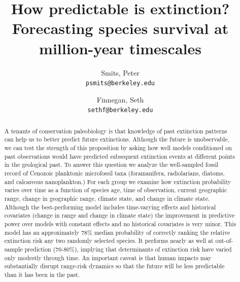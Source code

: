 \documentclass[12pt,letterpaper]{article}
\title{How predictable is extinction? Forecasting species survival at million-year timescales}
\author{
  Smits, Peter\\
  \texttt{psmits@berkeley.edu} 
  \and
  Finnegan, Seth\\
  \texttt{sethf@berkeley.edu}
}
\date{}
\begin{document}
\begin{refsection}

\maketitle

\linenumbers{}
\modulolinenumbers[3]

\begin{abstract}
  A tenants of conservation paleobiology is that knowledge of past extinction patterns can help us to better predict future extinctions. Although the future is unobservable, we can test the strength of this proposition by asking how well models conditioned on past observations would have predicted subsequent extinction events at different points in the geological past. To answer this question we analyze the well-sampled fossil record of Cenozoic planktonic microfossil taxa (foramanifera, radiolarians, diatoms, and calcareous nanoplankton.) For each group we examine how extinction probability varies over time as a function of species age, time of observation, current geographic range, change in geographic range, climate state, and change in climate state. Although the best-performing model includes time-varying effects and historical covariates (change in range and change in climate state) the improvement in predictive power over models with constant effects and no historical covariates is very minor. This model has an approximately 78\% median probability of correctly ranking the relative extinction risk any two randomly selected species. It performs nearly as well at out-of-sample prediction (70-80\%), implying that determinants of extinction risk have varied only modestly through time. An important caveat is that human impacts may substantially disrupt range-risk dynamics so that the future will be less predictable than it has been in the past.


\end{abstract}
\end{refsection}
\end{document}
